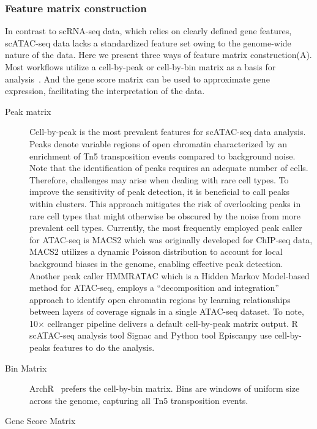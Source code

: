 \subsubsection{Feature matrix construction} 
In contrast to scRNA-seq data, which relies on clearly defined gene features, scATAC-seq data lacks a standardized feature set owing to the genome-wide nature of the data. Here we present three ways of feature matrix construction(A). Most workflows utilize a cell-by-peak or cell-by-bin matrix as a basis for analysis~\citep{heumos2023best}. And the gene score matrix can be used to approximate gene expression, facilitating the interpretation of the data.
\begin{description}
	\item[Peak matrix]
	Cell-by-peak is the most prevalent features for scATAC-seq data analysis. Peaks denote variable regions of open chromatin characterized by an enrichment of Tn5 transposition events compared to background noise. Note that the identification of peaks requires an adequate number of cells. Therefore, challenges may arise when dealing with rare cell types. To improve the sensitivity of peak detection, it is beneficial to call peaks within clusters. This approach mitigates the risk of overlooking peaks in rare cell types that might otherwise be obscured by the noise from more prevalent cell types. Currently, the most frequently employed peak caller for ATAC-seq is MACS2 \citep{zhang2008macs2} which was originally developed for ChIP-seq data, MACS2 utilizes a dynamic Poisson distribution to account for local background biases in the genome, enabling effective peak detection. Another peak caller HMMRATAC \citep{tarbell2019hmmratac} which is a Hidden Markov Model-based method for ATAC-seq, employs a ``decomposition and integration'' approach to identify open chromatin regions by learning relationships between layers of coverage signals in a single ATAC-seq dataset.  To note, 10$\times$ cellranger pipeline delivers a default cell-by-peak matrix output. R scATAC-seq analysis tool Signac\citep{signac} and Python tool Episcanpy\citep{Danese2021episcanpy} use cell-by-peaks features to do the analysis.

	\item[Bin Matrix]
	ArchR~\citep{Granja2021} prefers the cell-by-bin matrix. Bins are windows of uniform size across the genome, capturing all Tn5 transposition events.
	
	\item[Gene Score Matrix]

\end{description}


